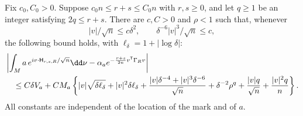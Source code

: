 \begin{lemma}
\label{lem:marked-spectral}
Fix $c_0,C_0>0$. Suppose $c_0n\le r+s\le C_0n$ with $r,s\ge0$,
and let $q\ge1$ be an integer satisfying $2q\le r+s$. There are
$c,C>0$ and $\rho<1$ such that, whenever
\[
 |v|/\sqrt n\le c\delta^2,\qquad
 \delta^{-6}|v|^3/\sqrt n\le c,
\]
the following bound holds, with $\ell_\delta=1+|\log\delta|$:
\begin{align}
 &\left|\int_M a\,e^{iv\cdot\mathsf H_{r,s,R}/\sqrt n}\dd\nu
      -\alpha_a e^{-\frac{r+s}{2n}v^{\mathsf T}\Gamma_Rv}\right|
       \notag\\
 &\quad\le C\delta V_a+C M_a\left\{
 |v|\sqrt{\delta\ell_\delta}+|v|^2\delta\ell_\delta
 +\frac{|v|\delta^{-4}+|v|^3\delta^{-6}}{\sqrt n}
 +\delta^{-2}\rho^q+\frac{|v|q}{\sqrt n}
 +\frac{|v|^2q}{n}\right\}.
       \label{eq:marked-spectral-bound}
\end{align}
All constants are independent of the location of the mark and of $a$.
\end{lemma}
